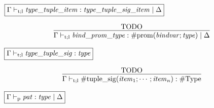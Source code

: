 $\fbox{$\Gamma \vdash_{\mathrm{t}; \mathrm{l}} \mathit{type\_tuple\_item}: \mathit{type\_tuple\_sig\_item} \mid \Delta$}$

\begin{gather*}
    \infer{\Gamma \vdash_{\mathrm{t}; \mathrm{l}} \mathit{bind\_prom\_type}: \mathrm{\#prom}(\mathit{bindvar}; \mathit{type}) \mid \Delta}{
        \text{TODO}
    }
\end{gather*}

$\fbox{$\Gamma \vdash_{\mathrm{t}; \mathrm{l}} \mathit{type\_tuple\_sig}: \mathit{type}$}$

\begin{gather*}
    \infer{\Gamma \vdash_{\mathrm{t}; \mathrm{l}} \mathrm{\#tuple\_sig}(\mathit{item}_1; \cdots; \mathit{item}_n): \mathrm{\#Type}}{
        \text{TODO}
    }
\end{gather*}

$\fbox{$\Gamma \vdash_\mathrm{p} \mathit{pat}: \mathit{type} \mid \Delta$}$

